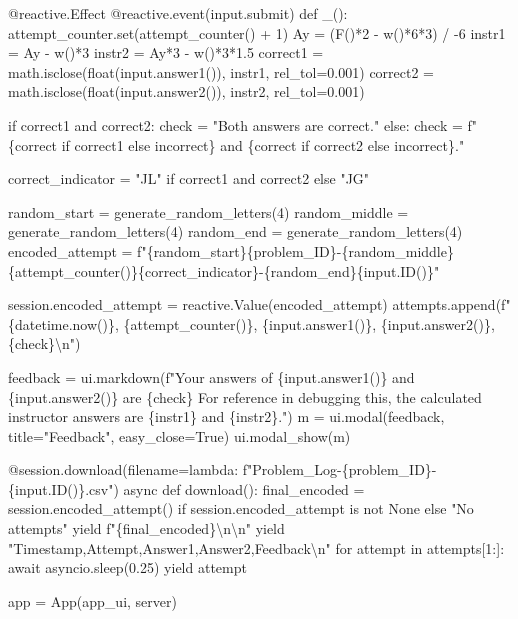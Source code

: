 \documentclass[
  letterpaper,
  DIV=11,
  numbers=noendperiod]{scrreprt}
\newenvironment{Shaded}{\begin{snugshade}}{\end{snugshade}}
\newcommand{\NormalTok}[1]{\textcolor[rgb]{0.00,0.23,0.31}{#1}}
\begin{document}
\begin{Shaded}
\begin{Highlighting}[]
\NormalTok{    @reactive.Effect}
\NormalTok{    @reactive.event(input.submit)}
\NormalTok{    def \_():}
\NormalTok{        attempt\_counter.set(attempt\_counter() + 1)}
\NormalTok{        Ay = (F()*2 {-} w()*6*3) / {-}6}
\NormalTok{        instr1 = Ay {-} w()*3}
\NormalTok{        instr2 = Ay*3 {-} w()*3*1.5}
\NormalTok{        correct1 = math.isclose(float(input.answer1()), instr1, rel\_tol=0.001)}
\NormalTok{        correct2 = math.isclose(float(input.answer2()), instr2, rel\_tol=0.001)}
        
\NormalTok{        if correct1 and correct2:}
\NormalTok{            check = "Both answers are correct."}
\NormalTok{        else:}
\NormalTok{            check = f" \{\textquotesingle{}correct\textquotesingle{} if correct1 else \textquotesingle{}incorrect\textquotesingle{}\} and \{\textquotesingle{}correct\textquotesingle{} if correct2 else \textquotesingle{}incorrect\textquotesingle{}\}."}
        
\NormalTok{        correct\_indicator = "JL" if correct1 and correct2 else "JG"}

\NormalTok{        random\_start = generate\_random\_letters(4)}
\NormalTok{        random\_middle = generate\_random\_letters(4)}
\NormalTok{        random\_end = generate\_random\_letters(4)}
\NormalTok{        encoded\_attempt = f"\{random\_start\}\{problem\_ID\}{-}\{random\_middle\}\{attempt\_counter()\}\{correct\_indicator\}{-}\{random\_end\}\{input.ID()\}"}

\NormalTok{        session.encoded\_attempt = reactive.Value(encoded\_attempt)}
\NormalTok{        attempts.append(f"\{datetime.now()\}, \{attempt\_counter()\}, \{input.answer1()\}, \{input.answer2()\}, \{check\}\textbackslash{}n")}

\NormalTok{        feedback = ui.markdown(f"Your answers of \{input.answer1()\} and \{input.answer2()\} are \{check\} For reference in debugging this, the calculated instructor answers are \{instr1\} and \{instr2\}.")}
\NormalTok{        m = ui.modal(feedback, title="Feedback", easy\_close=True)}
\NormalTok{        ui.modal\_show(m)}

\NormalTok{    @session.download(filename=lambda: f"Problem\_Log{-}\{problem\_ID\}{-}\{input.ID()\}.csv")}
\NormalTok{    async def download():}
\NormalTok{        final\_encoded = session.encoded\_attempt() if session.encoded\_attempt is not None else "No attempts"}
\NormalTok{        yield f"\{final\_encoded\}\textbackslash{}n\textbackslash{}n"}
\NormalTok{        yield "Timestamp,Attempt,Answer1,Answer2,Feedback\textbackslash{}n"}
\NormalTok{        for attempt in attempts[1:]:}
\NormalTok{            await asyncio.sleep(0.25)}
\NormalTok{            yield attempt}

\NormalTok{app = App(app\_ui, server)}
\end{Highlighting}
\end{Shaded}
\end{document}
